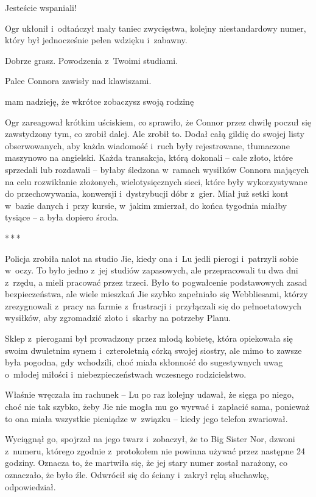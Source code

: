 \documentclass[oneside,polish,11pt,rmheadings]{mwbk}
\newcommand{\threeast}{\par\centerline{*\,*\,*}\medskip\par}
\begin{document}
\noindent {\textgreater} Jesteście wspaniali!

Ogr  ukłonił i~odtańczył mały taniec zwycięstwa, kolejny niestandardowy numer, który był jednocześnie pełen wdzięku i~zabawny.

\noindent {\textgreater} Dobrze grasz. Powodzenia z~Twoimi studiami.

Palce Connora zawisły nad klawiszami.

\noindent {\textgreater} mam nadzieję, że wkrótce zobaczysz swoją rodzinę

Ogr zareagował krótkim uściskiem, co sprawiło, że Connor przez chwilę poczuł się zawstydzony tym, co zrobił dalej. Ale zrobił to. Dodał całą gildię do swojej listy obserwowanych, aby każda wiadomość i~ruch były rejestrowane, tłumaczone maszynowo na angielski. Każda transakcja, którą dokonali -- całe złoto, które sprzedali lub rozdawali -- byłaby śledzona w~ramach wysiłków Connora mających na celu rozwikłanie złożonych, wielotysięcznych sieci, które były wykorzystywane do przechowywania, konwersji i~dystrybucji dóbr z~gier. Miał już setki kont w~bazie danych i~przy kursie, w~jakim zmierzał, do końca tygodnia miałby tysiące -- a była dopiero środa.

\bigskip
\threeast

Policja zrobiła nalot na studio Jie, kiedy ona i~Lu jedli pierogi i~patrzyli sobie w~oczy. To było jedno z~jej studiów zapasowych, ale przepracowali tu dwa dni z~rzędu, a mieli pracować przez trzeci. Było to pogwałcenie podstawowych zasad bezpieczeństwa, ale wiele mieszkań Jie szybko zapełniało się Webbliesami, którzy zrezygnowali z~pracy na farmie z~frustracji i~przyłączali się do pełnoetatowych wysiłków, aby zgromadzić złoto i~skarby na potrzeby Planu.

Sklep z~pierogami był prowadzony przez młodą kobietę, która opiekowała się swoim dwuletnim synem i~czteroletnią córką swojej siostry, ale mimo to zawsze była pogodna, gdy wchodzili, choć miała skłonność do sugestywnych uwag o~młodej miłości i~niebezpieczeństwach wczesnego rodzicielstwo.

Właśnie wręczała im rachunek -- Lu po raz kolejny udawał, że sięga po niego, choć nie tak szybko, żeby Jie nie mogła mu go wyrwać i~zapłacić sama, ponieważ to ona miała wszystkie pieniądze w~związku -- kiedy jego telefon zwariował.

Wyciągnął go, spojrzał na jego twarz i~zobaczył, że to Big Sister Nor, dzwoni z~numeru, którego zgodnie z~protokołem nie powinna używać przez następne 24 godziny. Oznacza to, że martwiła się, że jej stary numer został narażony, co oznaczało, że było źle. Odwrócił się do ściany i~zakrył ręką słuchawkę, odpowiedział.
\end{document}
